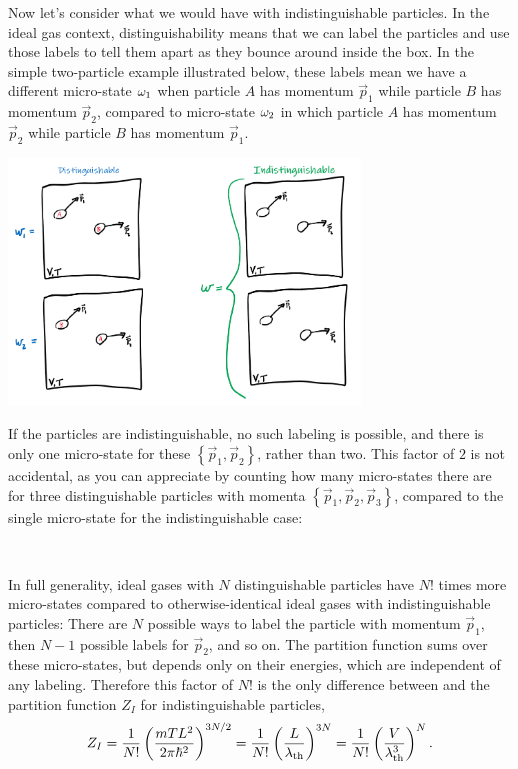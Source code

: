Now let's consider what we would have with indistinguishable particles.
In the ideal gas context, distinguishability means that we can label the particles and use those labels to tell them apart as they bounce around inside the box.
In the simple two-particle example illustrated below, these labels mean we have a different micro-state $\omega_1$ when particle $A$ has momentum $\vec p_1$ while particle $B$ has momentum $\vec p_2$, compared to micro-state $\omega_2$ in which particle $A$ has momentum $\vec p_2$ while particle $B$ has momentum $\vec p_1$.
\begin{center}
  \includegraphics[width=0.7\textwidth]{figs/week04_distinguish.pdf}
\end{center}
If the particles are indistinguishable, no such labeling is possible, and there is only one micro-state for these $\left\{\vec p_1, \vec p_2\right\}$, rather than two.
This factor of $2$ is not accidental, as you can appreciate by counting how many micro-states there are for three distinguishable particles with momenta $\left\{\vec p_1, \vec p_2, \vec p_3\right\}$, compared to the single micro-state for the indistinguishable case:
\begin{mdframed}
  \ \\[100 pt]
\end{mdframed}

In full generality, ideal gases with $N$ distinguishable particles have $N!$ times more micro-states compared to otherwise-identical ideal gases with indistinguishable particles: There are $N$ possible ways to label the particle with momentum $\vec{p}_1$, then $N - 1$ possible labels for $\vec{p}_2$, and so on.
The partition function sums over these micro-states, but depends only on their energies, which are independent of any labeling.
Therefore this factor of $N!$ is the only difference between  and the partition function $Z_I$ for indistinguishable particles,
\begin{equation}
  \label{eq:ideal_indis}
  Z_I = \frac{1}{N!} \left(\frac{mTL^2}{2\pi\hbar^2}\right)^{3N / 2} = \frac{1}{N!} \left(\frac{L}{\lambda_{\mathrm{th}}}\right)^{3N} = \frac{1}{N!} \left(\frac{V}{\lambda_{\mathrm{th}}^3}\right)^N.
\end{equation}




